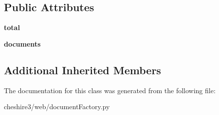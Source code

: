 \subsection*{Public Attributes}
\begin{DoxyCompactItemize}
\item 
\hypertarget{classcheshire3_1_1web_1_1document_factory_1_1_z3950_document_stream_ac1e8fc068db64ce9c65bbe2863663bfa}{{\bfseries total}}\label{classcheshire3_1_1web_1_1document_factory_1_1_z3950_document_stream_ac1e8fc068db64ce9c65bbe2863663bfa}

\item 
\hypertarget{classcheshire3_1_1web_1_1document_factory_1_1_z3950_document_stream_a7447712a61655b59a407b0f2065bdbcd}{{\bfseries documents}}\label{classcheshire3_1_1web_1_1document_factory_1_1_z3950_document_stream_a7447712a61655b59a407b0f2065bdbcd}

\end{DoxyCompactItemize}
\subsection*{Additional Inherited Members}


The documentation for this class was generated from the following file\-:\begin{DoxyCompactItemize}
\item 
cheshire3/web/document\-Factory.\-py\end{DoxyCompactItemize}
